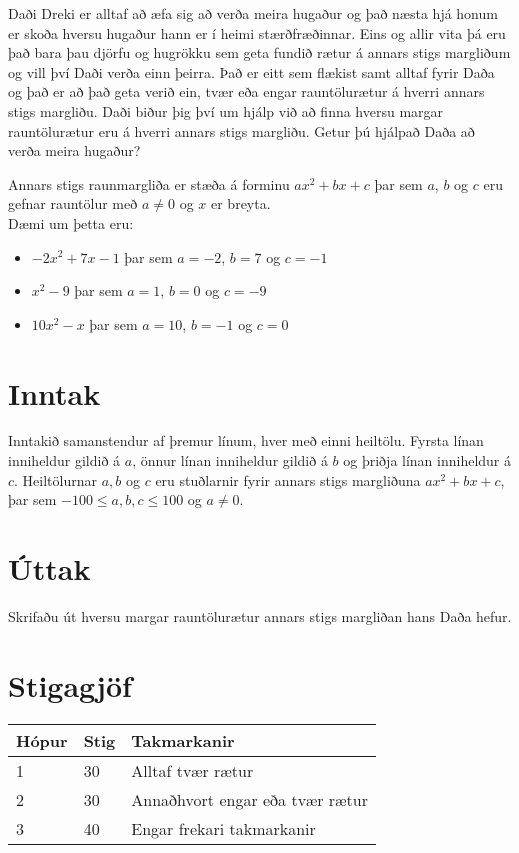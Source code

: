 
Daði Dreki er alltaf að æfa sig að verða meira hugaður og það næsta hjá honum er skoða hversu hugaður hann er í heimi stærðfræðinnar.
Eins og allir vita þá eru það bara þau djörfu og hugrökku sem geta fundið rætur á annars stigs margliðum og vill því Daði verða einn þeirra.
Það er eitt sem flækist samt alltaf fyrir Daða og það er að það geta verið ein, tvær eða engar rauntölurætur á hverri annars stigs margliðu.
Daði biður þig því um hjálp við að finna hversu margar rauntölurætur eru á hverri annars stigs margliðu.
Getur þú hjálpað Daða að verða meira hugaður?

Annars stigs raunmargliða er stæða á forminu $ax^2 + bx + c$ þar sem $a$, $b$ og $c$ eru gefnar rauntölur með $a \neq 0$ og $x$ er breyta.\\
Dæmi um þetta eru: 
\begin{itemize}
	\item $-2x^2 + 7x - 1$ þar sem $a = -2$, $b = 7$ og $c = -1$
	\item $x^2 - 9$ þar sem $a = 1$, $b = 0$ og $c = -9$ 
	\item $10x^2 - x$ þar sem $a = 10$, $b = -1$ og $c = 0$
\end{itemize}


\section*{Inntak}
Inntakið samanstendur af þremur línum, hver með einni heiltölu.
Fyrsta línan inniheldur gildið á $a$, önnur línan inniheldur gildið á $b$ og þriðja línan inniheldur á $c$. 
Heiltölurnar $a, b$ og $c$ eru stuðlarnir fyrir annars stigs margliðuna $ax^2 + bx + c$, þar sem $-100 \leq a, b, c \leq 100$ og $a \neq 0$. 

\section*{Úttak}
Skrifaðu út hversu margar rauntölurætur annars stigs margliðan hans Daða hefur.

\section*{Stigagjöf}
\begin{tabular}{|l|l|l|}
\hline
Hópur & Stig & Takmarkanir \\ \hline
1     & 30   & Alltaf tvær rætur \\ \hline
2     & 30   & Annaðhvort engar eða tvær rætur \\ \hline
3     & 40   & Engar frekari takmarkanir \\ \hline
\end{tabular}

